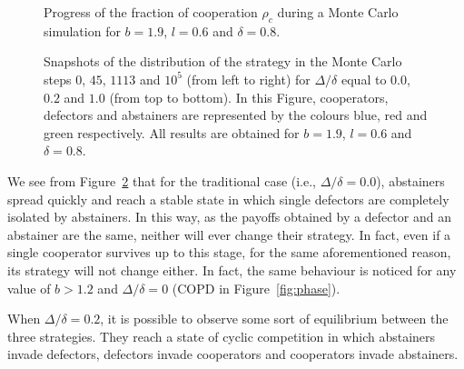 \documentclass{llncs}
\begin{document}
\begin{figure}[p]
    \centering
    {}
    \caption{
        Progress of the fraction of cooperation $\rho_c$ during a Monte Carlo
        simulation for $b=1.9$, $l=0.6$ and $\delta=0.8$.
    }
    \label{fig:c_mcs}
\end{figure}

\begin{figure}[p]
    \centering
    {}
    {}
    {}
    {}

    \vspace{0.07cm}

    {}
    {}
    {}
    {}

    \vspace{0.07cm}

    {}
    {}
    {}
    {}
    \caption{
        Snapshots of the distribution of the strategy in the Monte Carlo steps
        $0$, $45$, $1113$ and $10^5$ (from left to right) for $\Delta/\delta$
        equal to $0.0$, $0.2$ and $1.0$ (from top to bottom). In this Figure,
        cooperators, defectors and abstainers are represented by the colours
        blue, red and green respectively. All results are obtained for $b=1.9$,
        $l=0.6$ and $\delta=0.8$.
    }
    \label{fig:snapshots}
\end{figure}

We see from Figure~\ref{fig:snapshots} that for the traditional case (i.e.,
$\Delta/\delta=0.0$), abstainers spread quickly and reach a stable state in
which single defectors are completely isolated by abstainers. In this way, as
the payoffs obtained by a defector and an abstainer are the same, neither will
ever change their strategy. In fact, even if a single cooperator survives up to
this stage, for the same aforementioned reason, its strategy will not change
either. In fact, the same behaviour is noticed for any value of $b>1.2$ and
$\Delta/\delta=0$ (COPD in Figure~\ref{fig:phase}).

When $\Delta/\delta=0.2$, it is possible to observe some sort of equilibrium
between the three strategies. They reach a state of cyclic competition in which
abstainers invade defectors, defectors invade cooperators and cooperators
invade abstainers.
\end{document}
